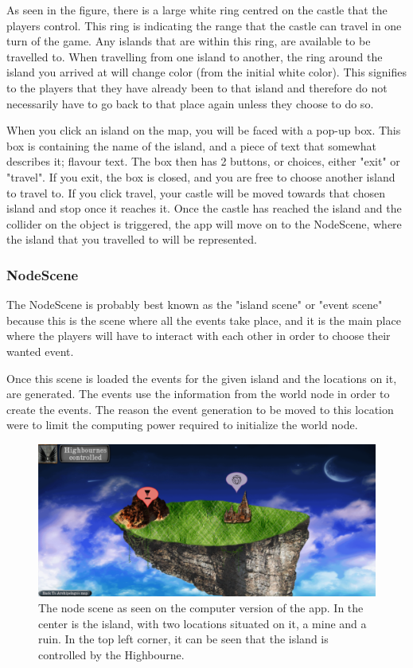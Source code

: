 As seen in the figure, there is a large white ring centred on the castle that the players control. This ring is indicating the range that the castle can travel in one turn of the game. Any islands that are within this ring, are available to be travelled to.
When travelling from one island to another, the ring around the island you arrived at will change color (from the initial white color). This signifies to the players that they have already been to that island and therefore do not necessarily have to go back to that place again unless they choose to do so.

When you click an island on the map, you will be faced with a pop-up box. This box is containing the name of the island, and a piece of text that somewhat describes it; flavour text. The box then has 2 buttons, or choices, either "exit" or "travel". If you exit, the box is closed, and you are free to choose another island to travel to. If you click travel, your castle will be moved towards that chosen island and stop once it reaches it. 
Once the castle has reached the island and the collider on the object is triggered, the app will move on to the NodeScene, where the island that you travelled to will be represented.

\subsubsection{NodeScene}
\label{sec:nodeScene}
The NodeScene is probably best known as the "island scene" or "event scene" because this is the scene where all the events take place, and it is the main place where the players will have to interact with each other in order to choose their wanted event.

Once this scene is loaded the events for the given island and the locations on it, are generated. The events use the information from the world node in order to create the events. The reason the event generation to be moved to this location were to limit the computing power required to initialize the world node. 

\begin{figure}[!ht]
    \centering
    \includegraphics[width=\textwidth]{Images/NodeScene.png}
    \caption{The node scene as seen on the computer version of the app. In the center is the island, with two locations situated on it, a mine and a ruin. In the top left corner, it can be seen that the island is controlled by the Highbourne.}
    \label{fig:nodescene}
\end{figure}

